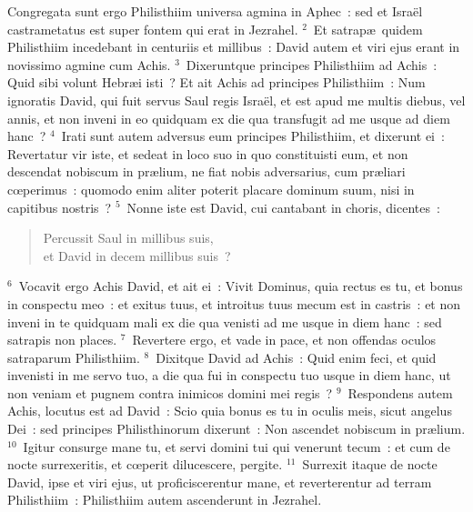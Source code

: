 \lettrine[lines=10,image=true,loversize=0.05,lraise=-0.03]{C}{}ongregata sunt ergo Philisthiim universa agmina in Aphec~: sed et Isra\"el castrametatus est super fontem qui erat in Jezrahel.
${}^{2}$~Et satrap\ae\ quidem Philisthiim incedebant in centuriis et millibus~: David autem et viri ejus erant in novissimo agmine cum Achis.
${}^{3}$~Dixeruntque principes Philisthiim ad Achis~: Quid sibi volunt Hebr\ae i isti~? Et ait Achis ad principes Philisthiim~: Num ignoratis David, qui fuit servus Saul regis Isra\"el, et est apud me multis diebus, vel annis, et non inveni in eo quidquam ex die qua transfugit ad me usque ad diem hanc~?
${}^{4}$~Irati sunt autem adversus eum principes Philisthiim, et dixerunt ei~: Revertatur vir iste, et sedeat in loco suo in quo constituisti eum, et non descendat nobiscum in pr\ae lium, ne fiat nobis adversarius, cum pr\ae liari cœperimus~: quomodo enim aliter poterit placare dominum suum, nisi in capitibus nostris~?
${}^{5}$~Nonne iste est David, cui cantabant in choris, dicentes~: \begin{flushleft}\begin{verse}Percussit Saul in millibus suis,\\ et David in decem millibus suis~?\end{verse}\end{flushleft}


${}^{6}$~Vocavit ergo Achis David, et ait ei~: Vivit Dominus, quia rectus es tu, et bonus in conspectu meo~: et exitus tuus, et introitus tuus mecum est in castris~: et non inveni in te quidquam mali ex die qua venisti ad me usque in diem hanc~: sed satrapis non places.
${}^{7}$~Revertere ergo, et vade in pace, et non offendas oculos satraparum Philisthiim.
${}^{8}$~Dixitque David ad Achis~: Quid enim feci, et quid invenisti in me servo tuo, a die qua fui in conspectu tuo usque in diem hanc, ut non veniam et pugnem contra inimicos domini mei regis~?
${}^{9}$~Respondens autem Achis, locutus est ad David~: Scio quia bonus es tu in oculis meis, sicut angelus Dei~: sed principes Philisthinorum dixerunt~: Non ascendet nobiscum in pr\ae lium.
${}^{10}$~Igitur consurge mane tu, et servi domini tui qui venerunt tecum~: et cum de nocte surrexeritis, et cœperit dilucescere, pergite.
${}^{11}$~Surrexit itaque de nocte David, ipse et viri ejus, ut proficiscerentur mane, et reverterentur ad terram Philisthiim~: Philisthiim autem ascenderunt in Jezrahel.

